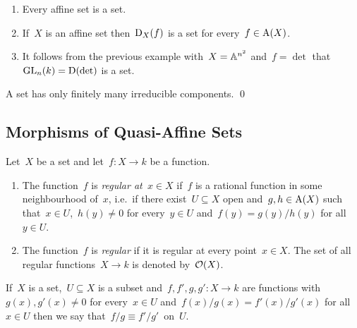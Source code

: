 \begin{example}
  \leavevmode
  \begin{enumerate}
    \item
      Every affine set is a {\qaffine} set.
    \item
      If~$X$ is an affine set then~$\operatorname{D}_X(f)$ is a {\qaffine} set for every~$f \in \operatorname{A}(X)$.
    \item
      It follows from the previous example with~$X = \mathbb{A}^{n^2}$ and~$f = \det$ that~$\operatorname{GL}_n(k) = \operatorname{D}(\operatorname{det})$ is a {\qaffine} set.
  \end{enumerate}
\end{example}


\begin{lemma}
\label{quasi-affine have only finitely many irreducible}
  A {\qaffine} set has only finitely many irreducible components.
  \qed
\end{lemma}





\subsection{Morphisms of Quasi-Affine Sets}


\begin{definition}
  \label{regular for quasiaffine}
  Let~$X$ be a {\qaffine} set and let~$f \colon X \to k$ be a function.
  \begin{enumerate}
    \item
      The function~$f$ is \emph{regular at~$x \in X$} if~$f$ is a rational function in some neighbourhood of~$x$, i.e.\ if there exist~$U \subseteq X$ open and~$g, h \in \operatorname{A}(X)$ such that~$x \in U$,~$h(y) \neq 0$ for every~$y \in U$ and~$f(y) = g(y)/h(y)$ for all~$y \in U$.
    \item
      The function~$f$ is \emph{regular} if it is regular at every point~$x \in X$.
      The set of all regular functions~$X \to k$ is denoted by~$\mathcal{O}(X)$.
  \end{enumerate}
\end{definition}


\begin{notation}
  If~$X$ is a set,~$U \subseteq X$ is a subset and~$f, f', g, g' \colon X \to k$ are functions with~$g(x), g'(x) \neq 0$ for every~$x \in U$ and~$f(x)/g(x) = f'(x)/g'(x)$ for all~$x \in U$ then we say that~$f/g \equiv f'/g'$~on~$U$.
\end{notation}


